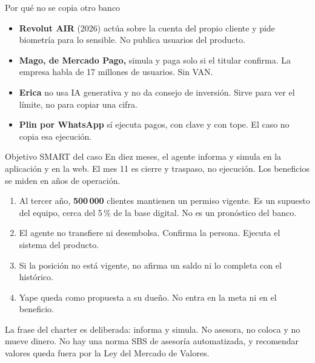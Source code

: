 \documentclass[aspectratio=169,11pt]{beamer}
\begin{document}
\begin{frame}{Por qué no se copia otro banco}
\vspace{0.05cm}
\begin{itemize}
\setlength{\itemsep}{0.16em}
  \item \textbf{Revolut AIR} (2026) actúa sobre la cuenta del propio cliente y pide biometría para lo sensible. No publica usuarios del producto.
  \item \textbf{Mago, de Mercado Pago,} simula y paga solo si el titular confirma. La empresa habla de 17 millones de usuarios. Sin VAN.
  \item \textbf{Erica} no usa IA generativa y no da consejo de inversión. Sirve para ver el límite, no para copiar una cifra.
  \item \textbf{Plin por WhatsApp} sí ejecuta pagos, con clave y con tope. El caso no copia esa ejecución.
\end{itemize}
\vspace{0.15cm}
\end{frame}

\begin{frame}{Objetivo SMART del caso}
\vspace{0.15cm}
En diez meses, el agente informa y simula en la aplicación y en la web. El mes 11 es cierre y traspaso, no ejecución. Los beneficios se miden en años de operación.

\vspace{0.4em}
\begin{enumerate}
\setlength{\itemsep}{0.2em}
  \item Al tercer año, \textbf{500\,000} clientes mantienen un permiso vigente. Es un supuesto del equipo, cerca del 5\,\% de la base digital. No es un pronóstico del banco.
  \item El agente no transfiere ni desembolsa. Confirma la persona. Ejecuta el sistema del producto.
  \item Si la posición no está vigente, no afirma un saldo ni lo completa con el histórico.
  \item Yape queda como propuesta a su dueño. No entra en la meta ni en el beneficio.
\end{enumerate}
\vspace{0.3cm}
{\small La frase del charter es deliberada: informa y simula. No asesora, no coloca y no mueve dinero. No hay una norma SBS de asesoría automatizada, y recomendar valores queda fuera por la Ley del Mercado de Valores.}
\end{frame}
\end{document}
